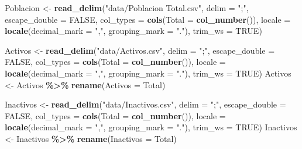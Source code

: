 \documentclass[notspecified,article,submit,moreauthors,pdftex]{Definitions/mdpi}
\newenvironment{Shaded}{\begin{snugshade}}{\end{snugshade}}
\newcommand{\AttributeTok}[1]{\textcolor[rgb]{0.13,0.29,0.53}{#1}}
\newcommand{\ConstantTok}[1]{\textcolor[rgb]{0.56,0.35,0.01}{#1}}
\newcommand{\FunctionTok}[1]{\textcolor[rgb]{0.13,0.29,0.53}{\textbf{#1}}}
\newcommand{\NormalTok}[1]{#1}
\newcommand{\OtherTok}[1]{\textcolor[rgb]{0.56,0.35,0.01}{#1}}
\newcommand{\SpecialCharTok}[1]{\textcolor[rgb]{0.81,0.36,0.00}{\textbf{#1}}}
\newcommand{\StringTok}[1]{\textcolor[rgb]{0.31,0.60,0.02}{#1}}
\begin{document}
\begin{Shaded}
\begin{Highlighting}[]
\NormalTok{Poblacion }\OtherTok{\textless{}{-}} \FunctionTok{read\_delim}\NormalTok{(}\StringTok{"data/Poblacion Total.csv"}\NormalTok{, }
    \AttributeTok{delim =} \StringTok{";"}\NormalTok{, }\AttributeTok{escape\_double =} \ConstantTok{FALSE}\NormalTok{, }\AttributeTok{col\_types =} \FunctionTok{cols}\NormalTok{(}\AttributeTok{Total =} \FunctionTok{col\_number}\NormalTok{()), }
    \AttributeTok{locale =} \FunctionTok{locale}\NormalTok{(}\AttributeTok{decimal\_mark =} \StringTok{","}\NormalTok{, }\AttributeTok{grouping\_mark =} \StringTok{"."}\NormalTok{), }
    \AttributeTok{trim\_ws =} \ConstantTok{TRUE}\NormalTok{)}

\NormalTok{Activos }\OtherTok{\textless{}{-}} \FunctionTok{read\_delim}\NormalTok{(}\StringTok{"data/Activos.csv"}\NormalTok{, }
    \AttributeTok{delim =} \StringTok{";"}\NormalTok{, }\AttributeTok{escape\_double =} \ConstantTok{FALSE}\NormalTok{, }\AttributeTok{col\_types =} \FunctionTok{cols}\NormalTok{(}\AttributeTok{Total =} \FunctionTok{col\_number}\NormalTok{()), }
    \AttributeTok{locale =} \FunctionTok{locale}\NormalTok{(}\AttributeTok{decimal\_mark =} \StringTok{","}\NormalTok{, }\AttributeTok{grouping\_mark =} \StringTok{"."}\NormalTok{), }
    \AttributeTok{trim\_ws =} \ConstantTok{TRUE}\NormalTok{)}
\NormalTok{Activos }\OtherTok{\textless{}{-}}\NormalTok{ Activos }\SpecialCharTok{\%\textgreater{}\%} \FunctionTok{rename}\NormalTok{(}\StringTok{\textasciigrave{}}\AttributeTok{Activos}\StringTok{\textasciigrave{}} \OtherTok{=} \StringTok{\textasciigrave{}}\AttributeTok{Total}\StringTok{\textasciigrave{}}\NormalTok{)}

\NormalTok{Inactivos }\OtherTok{\textless{}{-}} \FunctionTok{read\_delim}\NormalTok{(}\StringTok{"data/Inactivos.csv"}\NormalTok{, }
    \AttributeTok{delim =} \StringTok{";"}\NormalTok{, }\AttributeTok{escape\_double =} \ConstantTok{FALSE}\NormalTok{, }\AttributeTok{col\_types =} \FunctionTok{cols}\NormalTok{(}\AttributeTok{Total =} \FunctionTok{col\_number}\NormalTok{()), }
    \AttributeTok{locale =} \FunctionTok{locale}\NormalTok{(}\AttributeTok{decimal\_mark =} \StringTok{","}\NormalTok{, }\AttributeTok{grouping\_mark =} \StringTok{"."}\NormalTok{), }
    \AttributeTok{trim\_ws =} \ConstantTok{TRUE}\NormalTok{)}
\NormalTok{Inactivos }\OtherTok{\textless{}{-}}\NormalTok{ Inactivos }\SpecialCharTok{\%\textgreater{}\%} \FunctionTok{rename}\NormalTok{(}\StringTok{\textasciigrave{}}\AttributeTok{Inactivos}\StringTok{\textasciigrave{}} \OtherTok{=} \StringTok{\textasciigrave{}}\AttributeTok{Total}\StringTok{\textasciigrave{}}\NormalTok{)}


\end{Highlighting}
\end{Shaded}
\end{document}

